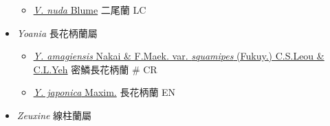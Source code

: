 \begin{itemize}
  \begin{itemize}
        \item[] \href{http://www.theplantlist.org/tpl1.1/search?q=Vrydagzynea+nuda}{\textit{V. nuda} Blume}   二尾蘭   LC
  \end{itemize}
 \item[] \textit{Yoania} 長花柄蘭屬
                                
  \begin{itemize}
        \item[] \href{http://www.theplantlist.org/tpl1.1/search?q=Yoania+amagiensis+var.+squamipes}{\textit{Y. amagiensis} Nakai \& F.Maek. var. \textit{squamipes} (Fukuy.) C.S.Leou \& C.L.Yeh}   密鱗長花柄蘭  \# CR
        \item[] \href{http://www.theplantlist.org/tpl1.1/search?q=Yoania+japonica}{\textit{Y. japonica} Maxim.}   長花柄蘭   EN
  \end{itemize}
 \item[] \textit{Zeuxine} 線柱蘭屬
                                

\end{itemize}
